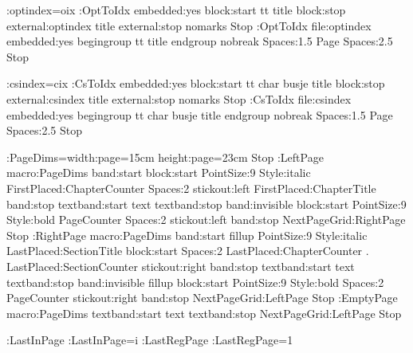 \def\opt#1{{\tt#1}}
\DefineExternalFile:optindex=oix
\def\refopt#1{\OptToIdx #1\par}
\DefineHeading:OptToIdx embedded:yes
    block:start tt title block:stop
    external:optindex title external:stop 
    nomarks Stop
\DefineExternalItem:OptToIdx file:optindex
    embedded:yes
    begingroup tt title endgroup 
    nobreak Spaces:1.5 Page Spaces:2.5 Stop

\DefineExternalFile:csindex=cix
\def\refcs#1{\CsToIdx #1\par}
\DefineHeading:CsToIdx embedded:yes
    block:start tt char busje title block:stop
    external:csindex title external:stop 
    nomarks Stop
\DefineExternalItem:CsToIdx file:csindex
    embedded:yes
    begingroup tt char busje title endgroup
    nobreak Spaces:1.5 Page Spaces:2.5 Stop

\OptionsMacro:PageDims=width:page=15cm height:page=23cm Stop
\DefinePageGrid:LeftPage macro:PageDims
    band:start block:start PointSize:9 Style:italic
               FirstPlaced:ChapterCounter Spaces:2 stickout:left
         FirstPlaced:ChapterTitle band:stop
    textband:start text textband:stop
    band:invisible block:start PointSize:9 Style:bold
         PageCounter Spaces:2 stickout:left band:stop
    NextPageGrid:RightPage Stop
\DefinePageGrid:RightPage macro:PageDims
    band:start fillup PointSize:9 Style:italic
        LastPlaced:SectionTitle
        block:start Spaces:2 LastPlaced:ChapterCounter . 
            LastPlaced:SectionCounter stickout:right
        band:stop
    textband:start text textband:stop
    band:invisible fillup 
        block:start PointSize:9 Style:bold Spaces:2
            PageCounter stickout:right band:stop
    NextPageGrid:LeftPage Stop
\DefinePageGrid:EmptyPage macro:PageDims
    textband:start text textband:stop
    NextPageGrid:LeftPage Stop

\AdaptiveCounter:LastInPage \CounterRepresentation:LastInPage=i
\AdaptiveCounter:LastRegPage \CounterRepresentation:LastRegPage=1

\endinput

92/11/05 stretch added
92/11/18 adaptive label width
92/11/19 adaptive last page